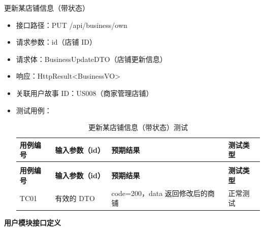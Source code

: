 \begin{levellist}
\begin{levellist}
        \item 更新某店铺信息（带状态）
        \begin{itemize}
            \item 接口路径：PUT /api/business/own
            \item 请求参数：id（店铺 ID）
            \item 请求体：BusinessUpdateDTO（店铺更新信息）
            \item 响应：HttpResult<BusinessVO>
            \item 关联用户故事 ID：US008（商家管理店铺）
            \item 测试用例：
                  \begin{longtable}{>{\centering\arraybackslash}m{2cm} >{\centering\arraybackslash}m{4cm} >{\centering\arraybackslash}m{5cm} >{\centering\arraybackslash}m{2cm}}

                      \caption{更新某店铺信息（带状态）测试} \label{tab:training}                              \\

                      \toprule
                      \textbf{用例编号} & \textbf{输入参数（id）} & \textbf{预期结果}          & \textbf{测试类型} \\
                      \midrule
                      \endfirsthead

                      \multicolumn{4}{c}{{\tablename\ \thetable{} 续表}}                           \\
                      \toprule
                      \textbf{用例编号} & \textbf{输入参数（id）} & \textbf{预期结果}          & \textbf{测试类型} \\
                      \midrule
                      \endhead

                      \bottomrule
                      \endfoot

                      TC01          & 有效的 DTO           & code=200，data 返回修改后的商铺 & 正常测试          \\
                  \end{longtable}
        \end{itemize}

    \end{levellist}

    \item \textbf{用户模块接口定义}
    \begin{levellist}


\end{levellist}
\end{levellist}

